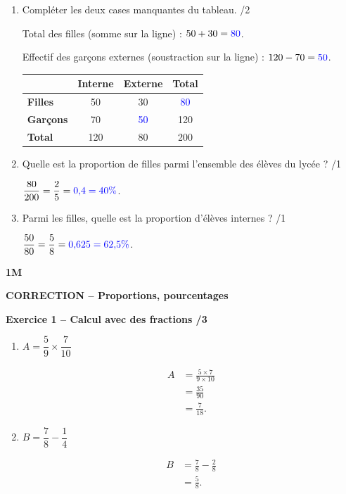 \documentclass[10pt,a4paper]{article}
\renewcommand{\niveau}{1M}
\renewcommand{\chapitre}{Proportions, pourcentages}
\renewcommand{\interroversion}[1]{
    \noindent\textbf{\niveau}

    \vspace{-0.5cm}
    \begin{center}
        \textbf{\large CORRECTION -- \chapitre}
    \end{center}

    \vspace{0.1cm}
}
\begin{document}
\begin{enumerate}
\item Compléter les deux cases manquantes du tableau. \hfill /2

Total des filles (somme sur la ligne) : \(50+30=\textcolor{blue}{80}\).

Effectif des garçons externes (soustraction sur la ligne) : \(120-70=\textcolor{blue}{50}\).

\begin{center}
\renewcommand{\arraystretch}{1.5}
\begin{tabular}{|l|c|c|c|}
\hline
 & \textbf{Interne} & \textbf{Externe} & \textbf{Total} \\
\hline
\textbf{Filles} & 50 & 30 & \textcolor{blue}{80} \\
\hline
\textbf{Garçons} & 70 & \textcolor{blue}{50} & 120 \\
\hline
\textbf{Total} & 120 & 80 & 200 \\
\hline
\end{tabular}
\end{center}

\item Quelle est la proportion de filles parmi l'ensemble des élèves du lycée ? \hfill /1

\(\dfrac{80}{200}=\dfrac{2}{5}=\textcolor{blue}{0{,}4=40\%}\).

\item Parmi les filles, quelle est la proportion d'élèves internes ? \hfill /1

\(\dfrac{50}{80}=\dfrac{5}{8}=\textcolor{blue}{0{,}625=62{,}5\%}\).
\end{enumerate}

\newpage


\interroversion{B}

\textbf{Exercice 1 -- Calcul avec des fractions \hfill /3}

\begin{enumerate}
\item \(A = \dfrac{5}{9}\times\dfrac{7}{10}\)

\[
\begin{aligned}
A &= \frac{5\times7}{9\times10}\\
  &= \frac{35}{90}\\
  &= \frac{7}{18}.
\end{aligned}
\]

\item \(B = \dfrac{7}{8}-\dfrac{1}{4}\)

\[
\begin{aligned}
B &= \frac{7}{8}-\frac{2}{8}\\
  &= \frac{5}{8}.
\end{aligned}
\]
\end{enumerate}
\end{document}
